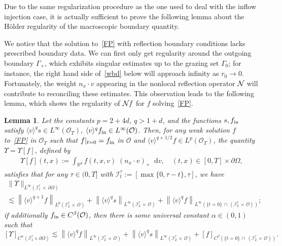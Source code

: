 \documentclass[10pt]{amsart}
\newtheorem{lemm}[theo]{Lemma}\newtheorem{prop}[theo]{Proposition}\newtheorem{coro}[theo]{Corollary}\newtheorem{conj}[theo]{Conjecture}
\theoremstyle{definition}\newtheorem{defi}[theo]{Definition}\newtheorem{rema}[theo]{Remark}\newtheorem{exam}[theo]{Example}\newtheorem{exem}[theo]{Example}\newtheorem{nota}[theo]{Notation}
\newcommand*{\dif}{\mathop{}\!\mathrm{d}}
\newcommand*\p{\partial}
\newcommand*\fin {f_{\rm in}}
\newcommand*\R {\mathbb{R}}
\newcommand*\I {\mathcal{I}}
\newcommand*\NN {{\mathcal{N}\hspace{-.3mm}}}
\newcommand*\OO {\mathcal{O}}
\newcommand{\lv}{\langle v\rangle}
\begin{document}
Due to the same regularization procedure as the one used to deal with the inflow injection case, it is actually sufficient to prove the following lemma about the H\"older regularity of the macroscopic boundary quantity.

We notice that the solution to~\eqref{FP} with reflection boundary conditions lacks prescribed boundary data. We can first only get regularity around the outgoing boundary $\Gamma_+$, which exhibits singular estimates up to the grazing set $\Gamma_0$; for instance, the right hand side of~\eqref{wbd} below will approach infinity as $r_0\rightarrow 0$. Fortunately, the weight $n_x\cdot v$ appearing in the nonlocal reflection operator $\NN$ will contribute to reconciling these estimates. This observation leads to the following lemma, which shows the regularity of $\NN f$ for $f$ solving~\eqref{FP}.

\begin{lemm}\label{diffusedata}
Let the constants $p=2+4d$, $q>1+d$, and the functions $s,\fin$ satisfy $\lv^qs\in L^\infty(\OO_T)$, $\lv^q\fin\in L^\infty(\OO)$. Then, for any weak solution $f$ to~\eqref{FP} in $\OO_T$ such that $f|_{t=0}=\fin$ in $\OO$ and $\lv^{q+1/2} f\in L^p(\OO_T)$, the quantity $\Upsilon=\Upsilon[f]$, defined by
\begin{align*}
\Upsilon[f](t,x):=\int_{\R^d}f(t,x,v)\;\!(n_x\cdot v)_+\dif v,
\quad (t,x)\in [0,T]\times\p\Omega,
\end{align*}
satisfies that for any $\tau\in(0,T]$ with $\I_t^\tau:=[\max\{0,\tau-t\},\tau]$, we have
\begin{multline}\label{databdd}
\|\Upsilon\|_{L^\infty\left(\I_1^\tau\,\times\,\p\Omega\right)}\\
\lesssim \left\|\lv^{q+1} f\right\|_{L^p\left(\I_2^\tau\,\times\,\OO\right)} + \left\|\lv^qs\right\|_{L^\infty\left(\I_2^\tau\,\times\,\OO\right)} + \left\|\lv^qf\right\|_{L^\infty\left(\{t=0\}\,\cap\,\left(\I_2^\tau\,\times\,\OO\right)\right)};
\end{multline}
if additionally $\fin\in C^\beta(\OO)$, then there is some universal constant $\alpha\in(0,1)$ such that
\begin{equation}\label{dataholder}
[\Upsilon]_{C^\alpha\left(\I_1^\tau\times\p\Omega\right)}
\lesssim \left\|\lv^{q} f\right\|_{L^\infty\left(\I_2^\tau\,\times\,\OO\right)} + \left\|\lv^qs\right\|_{L^\infty\left(\I_2^\tau\,\times\,\OO\right)} +[f]_{C^\beta\left(\{t=0\}\,\cap\,\left(\I_2^\tau\,\times\,\OO\right)\right)}.
\end{equation}
\end{lemm}
\end{document}

